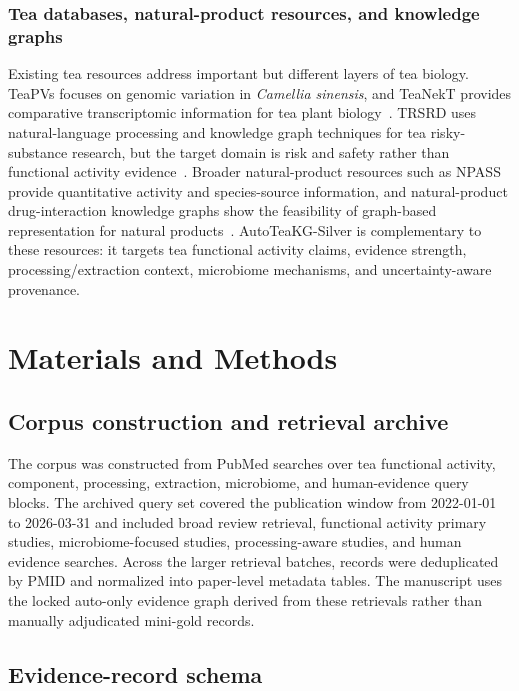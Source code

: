\documentclass[11pt]{article}
\begin{document}
\subsubsection{Tea databases, natural-product resources, and knowledge graphs}

Existing tea resources address important but different layers of tea biology. TeaPVs focuses on genomic variation in \textit{Camellia sinensis}, and TeaNekT provides comparative transcriptomic information for tea plant biology~\cite{an2022teapvs,zheng2024teanekt}. TRSRD uses natural-language processing and knowledge graph techniques for tea risky-substance research, but the target domain is risk and safety rather than functional activity evidence~\cite{wang2023trsrd}. Broader natural-product resources such as NPASS provide quantitative activity and species-source information, and natural-product drug-interaction knowledge graphs show the feasibility of graph-based representation for natural products~\cite{zhao2023npass_update,taneja2023npdi_kg}. AutoTeaKG-Silver is complementary to these resources: it targets tea functional activity claims, evidence strength, processing/extraction context, microbiome mechanisms, and uncertainty-aware provenance.

\section{Materials and Methods}

\subsection{Corpus construction and retrieval archive}

The corpus was constructed from PubMed searches over tea functional activity, component, processing, extraction, microbiome, and human-evidence query blocks. The archived query set covered the publication window from 2022-01-01 to 2026-03-31 and included broad review retrieval, functional activity primary studies, microbiome-focused studies, processing-aware studies, and human evidence searches. Across the larger retrieval batches, records were deduplicated by PMID and normalized into paper-level metadata tables. The manuscript uses the locked auto-only evidence graph derived from these retrievals rather than manually adjudicated mini-gold records.

\subsection{Evidence-record schema}
\end{document}
